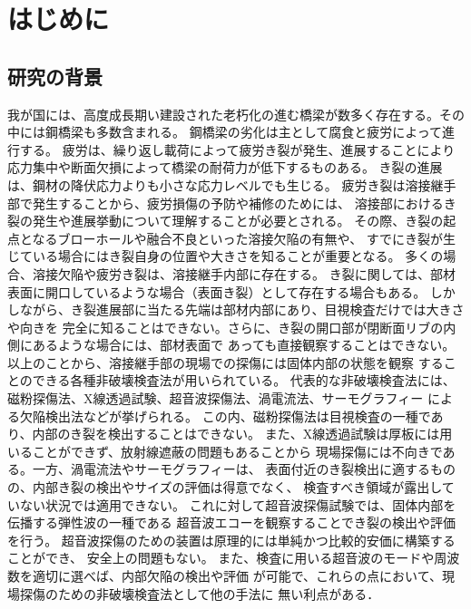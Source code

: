 ﻿\chapter{はじめに}
\section{研究の背景}
%
%
我が国には、高度成長期い建設された老朽化の進む橋梁が数多く存在する。その中には鋼橋梁も多数含まれる。
鋼橋梁の劣化は主として腐食と疲労によって進行する。
疲労は、繰り返し載荷によって疲労き裂が発生、進展することにより応力集中や断面欠損によって橋梁の耐荷力が低下するものある。
き裂の進展は、鋼材の降伏応力よりも小さな応力レベルでも生じる。
疲労き裂は溶接継手部で発生することから、疲労損傷の予防や補修のためには、
溶接部におけるき裂の発生や進展挙動について理解することが必要とされる。
その際、き裂の起点となるブローホールや融合不良といった溶接欠陥の有無や、
すでにき裂が生じている場合にはき裂自身の位置や大きさを知ることが重要となる。
多くの場合、溶接欠陥や疲労き裂は、溶接継手内部に存在する。
き裂に関しては、部材表面に開口しているような場合（表面き裂）として存在する場合もある。
しかしながら、き裂進展部に当たる先端は部材内部にあり、目視検査だけでは大きさや向きを
完全に知ることはできない。さらに、き裂の開口部が閉断面リブの内側にあるような場合には、部材表面で
あっても直接観察することはできない。
以上のことから、溶接継手部の現場での探傷には固体内部の状態を観察
することのできる各種非破壊検査法が用いられている。
代表的な非破壊検査法には、磁粉探傷法、X線透過試験、超音波探傷法、渦電流法、サーモグラフィー
による欠陥検出法などが挙げられる。
この内、磁粉探傷法は目視検査の一種であり、内部のき裂を検出することはできない。
また、X線透過試験は厚板には用いることができず、放射線遮蔽の問題もあることから
現場探傷には不向きである。一方、渦電流法やサーモグラフィーは、
表面付近のき裂検出に適するものの、内部き裂の検出やサイズの評価は得意でなく、
検査すべき領域が露出していない状況では適用できない。
これに対して超音波探傷試験では、固体内部を伝播する弾性波の一種である
超音波エコーを観察することでき裂の検出や評価を行う。
超音波探傷のための装置は原理的には単純かつ比較的安価に構築することができ、
安全上の問題もない。
また、検査に用いる超音波のモードや周波数を適切に選べば、内部欠陥の検出や評価
が可能で、これらの点において、現場探傷のための非破壊検査法として他の手法に
無い利点がある．\\


